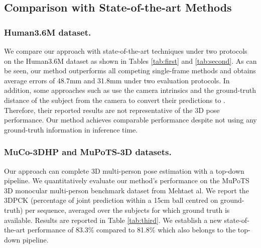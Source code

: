 \documentclass[letterpaper]{article} \usepackage{aaai21}  \usepackage{times}  \usepackage{helvet} \usepackage{courier}  \usepackage[hyphens]{url}  \usepackage{graphicx} \urlstyle{rm} \def\UrlFont{\rm}  \usepackage{natbib}  \usepackage{caption} \frenchspacing  \setlength{\pdfpagewidth}{8.5in}  \setlength{\pdfpageheight}{11in}
\begin{document}
\subsection{Comparison with State-of-the-art Methods}

\subsubsection{Human3.6M dataset.}
We compare our approach with state-of-the-art techniques under two protocols on the Human3.6M dataset \cite{ionescu2013human3} as shown in Tables \ref{tab:first} and \ref{tab:second}. As can be seen, our method outperforms all competing single-frame methods and obtains average errors of 48.7mm and 31.8mm under two evaluation protocols. In addition, some approaches such as \cite{sun2018integral,zhou2019hemlets} use the camera intrinsics and the ground-truth distance of the subject from the camera to convert their  predictions to . Therefore, their reported results are not representative of the 3D pose performance. Our method achieves comparable performance despite not using any ground-truth information in inference time.


\begin{table}[ht]
  \centering
  \small{
  }\caption{Comparison of our approach on the MuPoTS-3D benchmark dataset. The metric used is 3D percentage of correct keypoints (3DPCK), so higher is better.}
  \label{tab:third}\end{table}

\subsubsection{MuCo-3DHP and MuPoTS-3D datasets.} Our approach can complete 3D multi-person pose estimation with a top-down pipeline. We quantitatively evaluate our method’s performance on the MuPoTS 3D monocular multi-person benchmark dataset from Mehtaet al. We report the 3DPCK (percentage of joint prediction within a 15cm ball centred on ground-truth) per sequence, averaged over the subjects for which ground truth is available. Results are reported in Table \ref{tab:third}. We establish a new state-of-the-art performance of 83.3\% compared to 81.8\% which also belongs to the top-down pipeline. 
\end{document}

